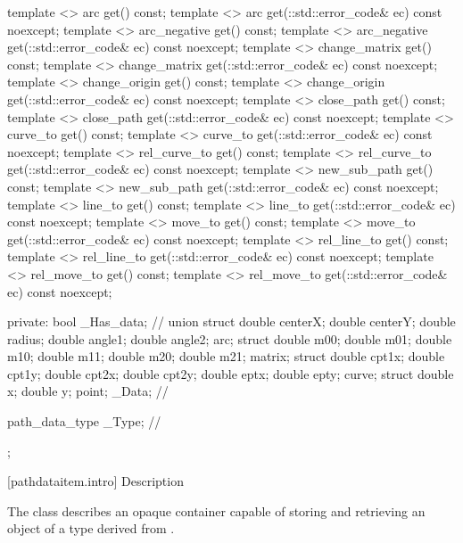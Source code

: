 \begin{codeblock}
{{{{{    template <>
    arc get() const;
    template <>
    arc get(::std::error_code& ec) const noexcept;
    template <>
    arc_negative get() const;
    template <>
    arc_negative get(::std::error_code& ec) const noexcept;
    template <>
    change_matrix get() const;
    template <>
    change_matrix get(::std::error_code& ec) const noexcept;
    template <>
    change_origin get() const;
    template <>
    change_origin get(::std::error_code& ec) const noexcept;
    template <>
    close_path get() const;
    template <>
    close_path get(::std::error_code& ec) const noexcept;
    template <>
    curve_to get() const;
    template <>
    curve_to get(::std::error_code& ec) const noexcept;
    template <>
    rel_curve_to get() const;
    template <>
    rel_curve_to get(::std::error_code& ec) const noexcept;
    template <>
    new_sub_path get() const;
    template <>
    new_sub_path get(::std::error_code& ec) const noexcept;
    template <>
    line_to get() const;
    template <>
    line_to get(::std::error_code& ec) const noexcept;
    template <>
    move_to get() const;
    template <>
    move_to get(::std::error_code& ec) const noexcept;
    template <>
    rel_line_to get() const;
    template <>
    rel_line_to get(::std::error_code& ec) const noexcept;
    template <>
    rel_move_to get() const;
    template <>
    rel_move_to get(::std::error_code& ec) const noexcept;

  private:
    bool _Has_data;         // \expos
    union {
      struct {
        double centerX;
        double centerY;
        double radius;
        double angle1;
        double angle2;
      } arc;
      struct {
        double m00;
        double m01;
        double m10;
        double m11;
        double m20;
        double m21;
      } matrix;
      struct {
        double cpt1x;
        double cpt1y;
        double cpt2x;
        double cpt2y;
        double eptx;
        double epty;
      } curve;
      struct {
        double x;
        double y;
      } point;
    } _Data;               // \expos

    path_data_type _Type;  // \expos
  };
} } } }
\end{codeblock}

 [pathdataitem.intro] { Description}

\pnum
{}
The class  describes an opaque container capable of storing and retrieving an object of a type derived from .

